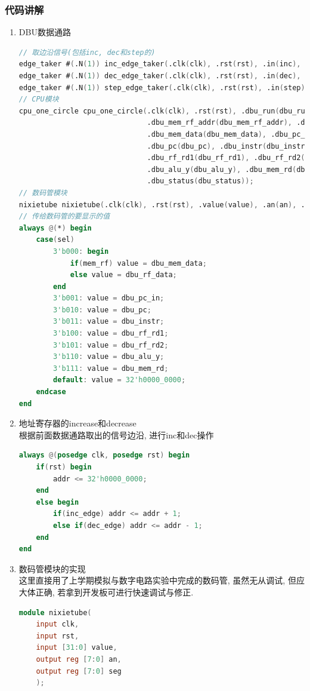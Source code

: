 \documentclass[UTF8]{article}
\begin{document}
\subsubsection{代码讲解}
\begin{enumerate}
	\item DBU数据通路
	\begin{lstlisting}[language=verilog]
// 取边沿信号(包括inc, dec和step的)
edge_taker #(.N(1)) inc_edge_taker(.clk(clk), .rst(rst), .in(inc), .out(inc_edge));
edge_taker #(.N(1)) dec_edge_taker(.clk(clk), .rst(rst), .in(dec), .out(dec_edge));
edge_taker #(.N(1)) step_edge_taker(.clk(clk), .rst(rst), .in(step), .out(dbu_run));
// CPU模块
cpu_one_circle cpu_one_circle(.clk(clk), .rst(rst), .dbu_run(dbu_run | succ),
                              .dbu_mem_rf_addr(dbu_mem_rf_addr), .dbu_rf_data(dbu_rf_data),
                              .dbu_mem_data(dbu_mem_data), .dbu_pc_in(dbu_pc_in),
                              .dbu_pc(dbu_pc), .dbu_instr(dbu_instr),
                              .dbu_rf_rd1(dbu_rf_rd1), .dbu_rf_rd2(dbu_rf_rd2),
                              .dbu_alu_y(dbu_alu_y), .dbu_mem_rd(dbu_mem_rd),
                              .dbu_status(dbu_status));
// 数码管模块
nixietube nixietube(.clk(clk), .rst(rst), .value(value), .an(an), .seg(seg));
// 传给数码管的要显示的值
always @(*) begin
    case(sel)
        3'b000: begin
            if(mem_rf) value = dbu_mem_data;
            else value = dbu_rf_data;
        end
        3'b001: value = dbu_pc_in;
        3'b010: value = dbu_pc;
        3'b011: value = dbu_instr;
        3'b100: value = dbu_rf_rd1;
        3'b101: value = dbu_rf_rd2;
        3'b110: value = dbu_alu_y;
        3'b111: value = dbu_mem_rd;
        default: value = 32'h0000_0000;
    endcase
end
	\end{lstlisting}
	
	\item 地址寄存器的increase和decrease\\
	根据前面数据通路取出的信号边沿, 进行inc和dec操作
	\begin{lstlisting}[language=verilog]
always @(posedge clk, posedge rst) begin
    if(rst) begin
        addr <= 32'h0000_0000;
    end
    else begin
        if(inc_edge) addr <= addr + 1;
        else if(dec_edge) addr <= addr - 1;
    end
end
	\end{lstlisting}
	
	\item 数码管模块的实现\\
	这里直接用了上学期模拟与数字电路实验中完成的数码管, 虽然无从调试, 但应大体正确, 若拿到开发板可进行快速调试与修正.
	\begin{lstlisting}[language=verilog]
module nixietube(
    input clk,
    input rst,
    input [31:0] value,
    output reg [7:0] an,
    output reg [7:0] seg
    );
    

\end{lstlisting}
\end{enumerate}
\end{document}
